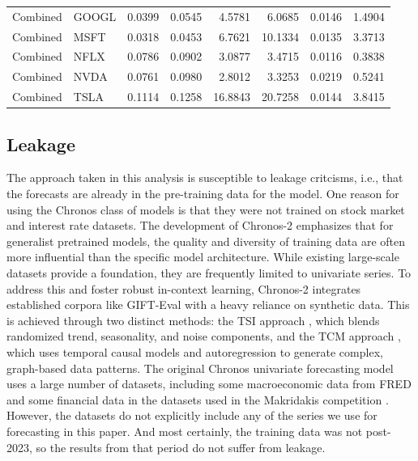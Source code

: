 \documentclass[twocolumn]{article}
\begin{document}
\begin{table}
{\begin{tabular}{llrrrrrr}
Combined & GOOGL  & 0.0399 & 0.0545  & 4.5781  & 6.0685  & 0.0146  & 1.4904  \\
Combined & MSFT   & 0.0318 & 0.0453  & 6.7621  & 10.1334 & 0.0135  & 3.3713  \\
Combined & NFLX   & 0.0786 & 0.0902  & 3.0877  & 3.4715  & 0.0116  & 0.3838  \\
Combined & NVDA   & 0.0761 & 0.0980  & 2.8012  & 3.3253  & 0.0219  & 0.5241  \\
Combined & TSLA   & 0.1114 & 0.1258  & 16.8843 & 20.7258 & 0.0144  & 3.8415 \\
\bottomrule
\end{tabular}
}
\end{table}

\subsection{Leakage}

The approach taken in this analysis is susceptible to leakage critcisms, i.e., that the forecasts are already in the pre-training data for the model. One reason for using the Chronos class of models is that they were not trained on stock market and interest rate datasets. The development of Chronos-2 \citep{ansari_chronos-2_2025} emphasizes that for generalist pretrained models, the quality and diversity of training data are often more influential than the specific model architecture. While existing large-scale datasets provide a foundation, they are frequently limited to univariate series. To address this and foster robust in-context learning, Chronos-2 integrates established corpora like GIFT-Eval with a heavy reliance on synthetic data. This is achieved through two distinct methods: the TSI approach \citep{bahrpeyma_methodology_2021}, which blends randomized trend, seasonality, and noise components, and the TCM approach \citep{runge_causal_2023}, which uses temporal causal models and autoregression to generate complex, graph-based data patterns. The original Chronos univariate forecasting model \citep{ansari_chronos_2024} uses a large number of datasets, including some macroeconomic data from FRED \citep{godahewa_monash_2021} and some financial data in the datasets used in the Makridakis competition \citep{makridakis_m4_2020}. However, the datasets do not explicitly include any of the series we use for forecasting in this paper. And most certainly, the training data was not post-2023, so the results from that period do not suffer from leakage. 
\end{document}
